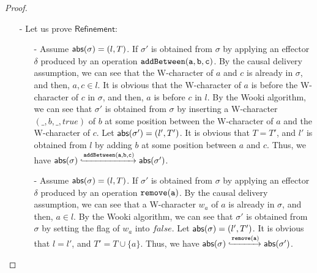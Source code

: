 \begin {proof}
\begin{itemize}
    Note that, by the causal delivery assumption and the preconditions of ${\tt addBetween}$ and ${\tt remove}$, it cannot happen that an $\alabelshort[{\tt addBetween}]{a,b,c}$ operation adding ${\tt b}$ between ${\tt a}$ and ${\tt c}$ is concurrent with an operation that adds ${\tt a}$ or ${\tt c}$ to the list, i.e., $\alabelshort[{\tt addBetween}]{\_,a,\_}$ or $\alabelshort[{\tt addBetween}]{\_,c,\_}$; or that an $\alabelshort[{\tt addBetween}]{a,b,c}$ operation adding ${\tt b}$ is concurrent with an operation $\alabelshort[{\tt remove}]{b}$ that removes ${\tt b}$. This ensures that reordering concurrent effectors doesn't lead to ``invalid'' replica states such as the replica state does not contains W-character of $a$ or $c$ while the effector requires to put $b$ between $a$ and $c$ (which would happen if $\alabelshort[{\tt addBetween}]{\_,a,\_}$ or $\alabelshort[{\tt addBetween}]{\_,c,\_}$ is delivered before $\alabelshort[{\tt addBetween}]{a,b,c}$), or a replica state does not contain W-character of $b$ when effector requires to remove $b$ (which would happen if $\alabelshort[{\tt remove}]{b}$ is delivered before $\alabelshort[{\tt addAfter}]{\_,b,\_}$).

\item[-] Let us prove $\mathsf{Refinement}$:
    \begin{itemize}
    \setlength{\itemsep}{0.5pt}
    \item[-] Assume $\mathsf{abs}(\sigma) = (l,T)$. If $\sigma'$ is obtained from $\sigma$ by applying an effector $\delta$ produced by an operation $\alabelshort[{\tt addBetween}]{a,b,c}$. By the causal delivery assumption, we can see that the W-character of $a$ and $c$ is already in $\sigma$, and then, $a,c \in l$. It is obvious that the W-character of $a$ is before the W-character of $c$ in $\sigma$, and then, $a$ is before $c$ in $l$. By the Wooki algorithm, we can see that $\sigma'$ is obtained from $\sigma$ by inserting a W-character $(\_,b,\_,\mathit{true})$ of $b$ at some position between the W-character of $a$ and the W-character of $c$. Let $\mathsf{abs}(\sigma') = (l',T')$. It is obvious that $T=T'$, and $l'$ is obtained from $l$ by adding $b$ at some position between $a$ and $c$. Thus, we have $\refmap(\sigma) \specarrow{\alabelshort[{\tt addBetween}]{a,b,c}} \refmap(\sigma')$.

    \item[-] Assume $\mathsf{abs}(\sigma) = (l,T)$. If $\sigma'$ is obtained from $\sigma$ by applying an effector $\delta$ produced by an operation $\alabelshort[{\tt remove}]{a}$. By the causal delivery assumption, we can see that a W-character $w_a$ of $a$ is already in $\sigma$, and then, $a \in l$. By the Wooki algorithm, we can see that $\sigma'$ is obtained from $\sigma$ by setting the flag of $w_a$ into $\mathit{false}$. Let $\mathsf{abs}(\sigma) = (l',T')$. It is obvious that $l=l'$, and $T' = T \cup \{ a \}$. Thus, we have $\refmap(\sigma) \specarrow{\alabelshort[{\tt remove}]{a}} \refmap(\sigma')$.


\end{itemize}
\end{itemize}
\end{proof}
